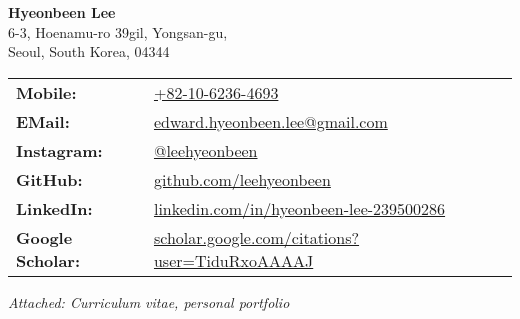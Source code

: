 \documentclass[a4paper,10pt]{extarticle}
\begin{document}
\begin{spacing}{1.2}
	\noindent
	\textbf{\large Hyeonbeen Lee}\\
	\normalsize
	6-3, Hoenamu-ro 39gil, Yongsan-gu,\\
	Seoul, South Korea, 04344
\end{spacing}
\small
\noindent
\begin{tabular}{@{}ll}
	\textbf{Mobile: }         & \href{tel:+82-10-6236-4693}{+82-10-6236-4693}                                                                 \\
	\textbf{EMail: }          & \href{mailto:edward.hyeonbeen.lee@gmail.com}{edward.hyeonbeen.lee@gmail.com}                                  \\
	\textbf{Instagram: }      & \href{https://www.instagram.com/leehyeonbeen}{@leehyeonbeen}                                                  \\
	\textbf{GitHub: }         & \href{https://github.com/leehyeonbeen}{github.com/leehyeonbeen}                                               \\
	\textbf{LinkedIn: }       & \href{https://www.linkedin.com/in/hyeonbeen-lee-239500286/}{linkedin.com/in/hyeonbeen-lee-239500286}          \\
	\textbf{Google Scholar: } & \href{https://scholar.google.com/citations?user=TiduRxoAAAAJ}{scholar.google.com/citations?user=TiduRxoAAAAJ} \\
\end{tabular}
\newline\newline
\noindent\large\textit{Attached: Curriculum vitae, personal portfolio}

\vfill
\hspace{0pt}
\pagebreak
\end{document}
